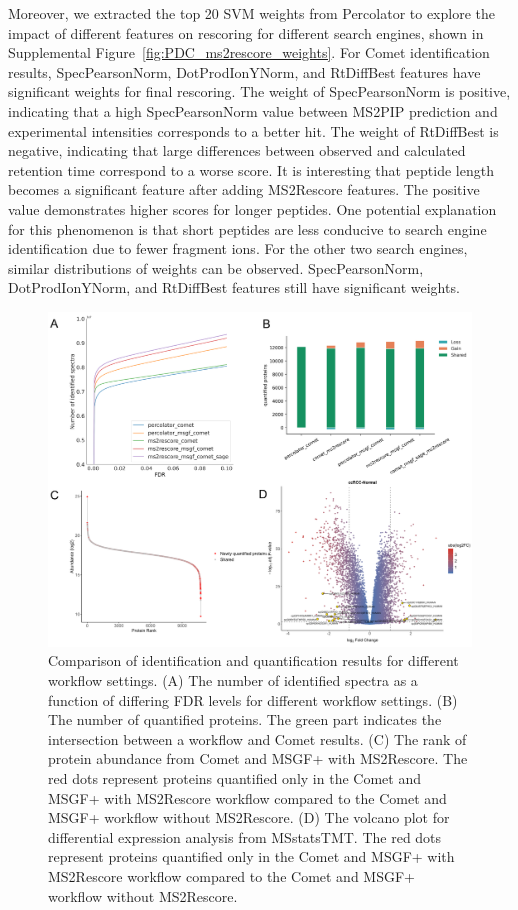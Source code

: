 \documentclass[12pt]{article}
\begin{document}
Moreover, we extracted the top 20 SVM weights from Percolator to explore the impact of different features on rescoring for different search engines, shown in Supplemental Figure~\ref{fig:PDC_ms2rescore_weights}. For Comet identification results, SpecPearsonNorm, DotProdIonYNorm, and RtDiffBest features have significant weights for final rescoring. The weight of SpecPearsonNorm is positive, indicating that a high SpecPearsonNorm value between MS2PIP prediction and experimental intensities corresponds to a better hit. The weight of RtDiffBest is negative, indicating that large differences between observed and calculated retention time correspond to a worse score. It is interesting that peptide length becomes a significant feature after adding MS2Rescore features. The positive value demonstrates higher scores for longer peptides. One potential explanation for this phenomenon is that short peptides are less conducive to search engine identification due to fewer fragment ions. For the other two search engines, similar distributions of weights can be observed. SpecPearsonNorm, DotProdIonYNorm, and RtDiffBest features still have significant weights.

\begin{figure}[ht!]
	\centering
	\includegraphics[width=1\textwidth]{figures//CPTAC_TMT.png}
	\caption{Comparison of identification and quantification results for different workflow settings. (A) The number of identified spectra as a function of differing FDR levels for different workflow settings. (B) The number of quantified proteins. The green part indicates the intersection between a workflow and Comet results. (C) The rank of protein abundance from Comet and MSGF+ with MS2Rescore. The red dots represent proteins quantified only in the Comet and MSGF+ with MS2Rescore workflow compared to the Comet and MSGF+ workflow without MS2Rescore. (D) The volcano plot for differential expression analysis from MSstatsTMT. The red dots represent proteins quantified only in the Comet and MSGF+ with MS2Rescore workflow compared to the Comet and MSGF+ workflow without MS2Rescore.}
	\label{fig:PDC_ms2rescore}
\end{figure}
\end{document}
